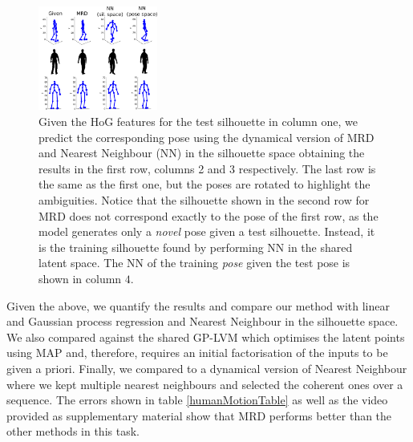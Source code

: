 \begin{figure}[ht]
\begin{center}
  \includegraphics[width=0.35\textwidth]{../diagrams/humanPose/ambiguityTest}
\end{center}
\caption{
Given the HoG features for the test silhouette in column one, we predict the corresponding pose using the dynamical version of MRD and Nearest Neighbour (NN) in the silhouette space
obtaining the results in the first row, columns 2 and 3 respectively. The last row is the same as the first one, but the poses are rotated
to highlight the ambiguities. Notice that the silhouette shown in the second row for MRD does not correspond exactly to the pose
of the first row, as the model generates only a \emph{novel} pose given a test silhouette. Instead, it is the training silhouette found by performing
NN in the shared latent space. 
The NN of the training \emph{pose} given the test pose is shown in column $4$.
}
\label{fig:humanPoseAmbiguityTest}
\end{figure}

\par Given the above, we quantify the results and compare our method
with linear and Gaussian process regression and Nearest Neighbour in
the silhouette space. We also compared against the shared GP-LVM
\cite{Ek:2008up, Ek:2009vv} which optimises the latent points using
MAP and, therefore, requires an initial factorisation of the inputs to
be given a priori.  Finally, we compared to a dynamical version of Nearest Neighbour where
we kept multiple nearest neighbours and selected the coherent ones over a sequence.
The errors shown in table \ref{humanMotionTable}
as well as the video provided as supplementary material show that MRD
performs better than the other methods in this task.



